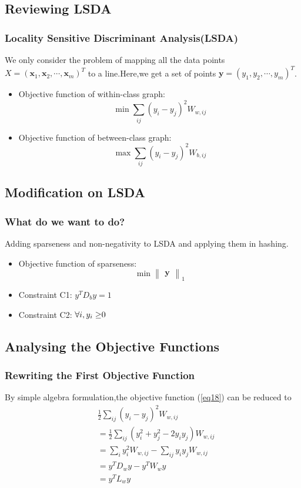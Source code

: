\documentclass{beamer}
\begin{document}
\subsection{Reviewing LSDA}
\begin{frame}\frametitle{Locality Sensitive Discriminant Analysis(LSDA)}
We only consider the problem of mapping all the data points $X=(\textbf{x}_1,\textbf{x}_2,\cdots,\textbf{x}_m)^T$ to a line.Here,we get a set of points $\textbf{y}=(y_1,y_2,\cdots,y_m)^T$.
\begin{itemize}
\item Objective function of within-class graph:
\begin{equation}\label{eq18}
\min\sum_{ij}(y_i-y_j)^2W_{w,ij}
\end{equation}
\item Objective function of between-class graph:
\begin{equation}\label{eq19}
\max\sum_{ij}(y_i-y_j)^2W_{b,ij}
\end{equation}
\end{itemize}
\end{frame}


\subsection{Modification on LSDA}
\begin{frame}\frametitle{What do we want to do?}
Adding sparseness and non-negativity to LSDA and applying them in hashing.
\begin{itemize}
\item Objective function of sparseness:
\begin{equation}\label{eq20}
\min\begin{Vmatrix}\textbf{y}\end{Vmatrix}_1
\end{equation}
\item Constraint C1: \(y^TD_by=1\)
\item Constraint C2: \(\forall i,y_i\geq$0$\)
\end{itemize}
\end{frame}


\subsection{Analysing the Objective Functions}
\begin{frame}\frametitle{Rewriting the First Objective Function}
By simple algebra formulation,the objective function (\ref{eq18}) can be reduced to
\begin{equation}\label{eq21}
\begin{split}
&\frac{1}{2}\sum_{ij}(y_i-y_j)^2W_{w,ij}\\
&=\frac{1}{2}\sum_{ij}(y_i^2+y_j^2-2y_i y_j)W_{w,ij}\\
&=\sum_i y_i^2W_{w,ij}-\sum_{ij}y_i y_j W_{w,ij}\\
&=y^T D_w y-y^T W_w y\\
&=y^T L_w y
\end{split}
\end{equation}
\end{frame}
\end{document}
